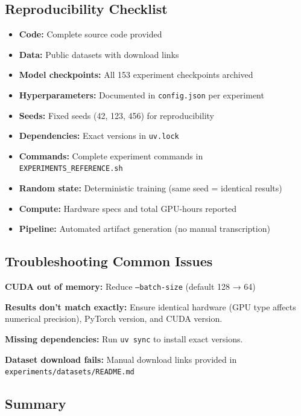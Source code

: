 \subsection{Reproducibility Checklist}

\begin{itemize}
    \item[$\boxtimes$] \textbf{Code:} Complete source code provided
    \item[$\boxtimes$] \textbf{Data:} Public datasets with download links
    \item[$\boxtimes$] \textbf{Model checkpoints:} All 153 experiment checkpoints archived
    \item[$\boxtimes$] \textbf{Hyperparameters:} Documented in \texttt{config.json} per experiment
    \item[$\boxtimes$] \textbf{Seeds:} Fixed seeds (42, 123, 456) for reproducibility
    \item[$\boxtimes$] \textbf{Dependencies:} Exact versions in \texttt{uv.lock}
    \item[$\boxtimes$] \textbf{Commands:} Complete experiment commands in \texttt{EXPERIMENTS\_REFERENCE.sh}
    \item[$\boxtimes$] \textbf{Random state:} Deterministic training (same seed = identical results)
    \item[$\boxtimes$] \textbf{Compute:} Hardware specs and total GPU-hours reported
    \item[$\boxtimes$] \textbf{Pipeline:} Automated artifact generation (no manual transcription)
\end{itemize}

\subsection{Troubleshooting Common Issues}

\textbf{CUDA out of memory:} Reduce \texttt{--batch-size} (default 128 → 64)

\textbf{Results don't match exactly:} Ensure identical hardware (GPU type affects numerical precision), PyTorch version, and CUDA version.

\textbf{Missing dependencies:} Run \texttt{uv sync} to install exact versions.

\textbf{Dataset download fails:} Manual download links provided in \texttt{experiments/datasets/README.md}

\subsection{Summary}

